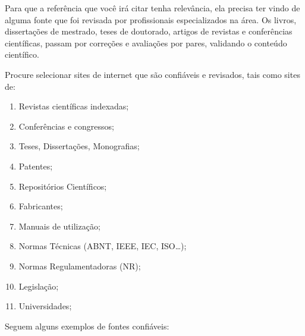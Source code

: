 Para que a referência que você irá citar tenha relevância, ela precisa ter vindo de alguma fonte que foi revisada por profissionais especializados na área. Os livros, dissertações de mestrado, teses de doutorado, artigos de revistas e conferências científicas, passam por correções e avaliações por pares, validando o conteúdo científico.  
    
Procure selecionar sites de internet que são confiáveis e revisados, tais como sites de:

\begin{enumerate}
    \item Revistas científicas indexadas;
    \item Conferências e congressos;
    \item Teses, Dissertações, Monografias;
    \item Patentes;
    \item Repositórios Científicos;
    \item Fabricantes;
    \item Manuais de utilização;
    \item Normas Técnicas (ABNT, IEEE, IEC, ISO\ldots);
    \item Normas Regulamentadoras (NR);  
    \item Legislação;
    \item Universidades;
\end{enumerate}

Seguem alguns exemplos de fontes confiáveis:

